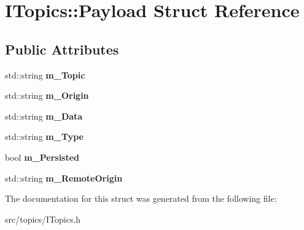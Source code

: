 \hypertarget{struct_i_topics_1_1_payload}{}\section{I\+Topics\+:\+:Payload Struct Reference}
\label{struct_i_topics_1_1_payload}
\subsection*{Public Attributes}
\begin{DoxyCompactItemize}
\item 
\mbox{\label{struct_i_topics_1_1_payload_ac889c310a7a69ac6bfd574045ab1e4e7}} 
std\+::string {\bfseries m\+\_\+\+Topic}
\item 
\mbox{\label{struct_i_topics_1_1_payload_a6f8f87a4edde56d9cb0ff4f93c57a959}} 
std\+::string {\bfseries m\+\_\+\+Origin}
\item 
\mbox{\label{struct_i_topics_1_1_payload_a3573ac1ffd82c911d5d16c38a90edf12}} 
std\+::string {\bfseries m\+\_\+\+Data}
\item 
\mbox{\label{struct_i_topics_1_1_payload_aa6f1c0f677b647364c15bd902095d2f9}} 
std\+::string {\bfseries m\+\_\+\+Type}
\item 
\mbox{\label{struct_i_topics_1_1_payload_a26d151854ceae1e79e995e6c1430c453}} 
bool {\bfseries m\+\_\+\+Persisted}
\item 
\mbox{\label{struct_i_topics_1_1_payload_a93de51619d1aba022ee91def595aeab6}} 
std\+::string {\bfseries m\+\_\+\+Remote\+Origin}
\end{DoxyCompactItemize}


The documentation for this struct was generated from the following file\+:\begin{DoxyCompactItemize}
\item 
src/topics/I\+Topics.\+h\end{DoxyCompactItemize}
